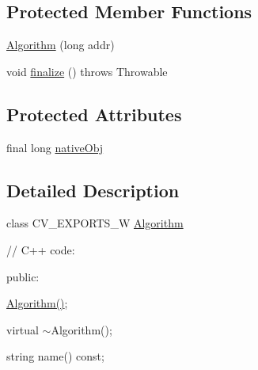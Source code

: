\subsection*{Protected Member Functions}
\begin{DoxyCompactItemize}
\item 
\mbox{\hyperlink{classorg_1_1opencv_1_1core_1_1_algorithm_ab4aace9fecac25577ba36664213173fe}{Algorithm}} (long addr)
\item 
void \mbox{\hyperlink{classorg_1_1opencv_1_1core_1_1_algorithm_a6100db1faf9f02274e5720036899fd8c}{finalize}} ()  throws Throwable 
\end{DoxyCompactItemize}
\subsection*{Protected Attributes}
\begin{DoxyCompactItemize}
\item 
final long \mbox{\hyperlink{classorg_1_1opencv_1_1core_1_1_algorithm_a6f9f2539b7dc22bc78573257240be381}{native\+Obj}}
\end{DoxyCompactItemize}


\subsection{Detailed Description}
class C\+V\+\_\+\+E\+X\+P\+O\+R\+T\+S\+\_\+W \mbox{\hyperlink{classorg_1_1opencv_1_1core_1_1_algorithm}{Algorithm}} {\ttfamily }

{\ttfamily }

{\ttfamily }

{\ttfamily // C++ code\+:}

{\ttfamily }

{\ttfamily }

{\ttfamily public\+:}

{\ttfamily }

{\ttfamily }

{\ttfamily \mbox{\hyperlink{classorg_1_1opencv_1_1core_1_1_algorithm_ab4aace9fecac25577ba36664213173fe}{Algorithm()}};}

{\ttfamily }

{\ttfamily }

{\ttfamily virtual $\sim$\+Algorithm();}

{\ttfamily }

{\ttfamily }

{\ttfamily string name() const;}

{\ttfamily }

